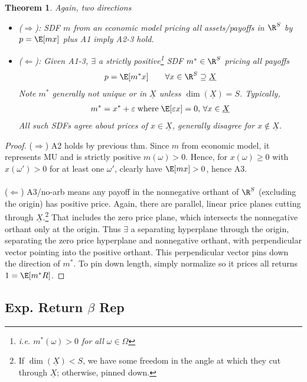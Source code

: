 \documentclass[12pt]{article}
\theoremstyle{plain}
\newtheorem{thm}{Theorem}[section]
\theoremstyle{definition}
\theoremstyle{remark}
\begin{document}
\begin{multicols*}{2}
\begin{thm}
Again, two directions
\begin{itemize}
  \item \emph{($\Rightarrow$):}
    SDF $m$ from an economic model pricing all assets/payoffs
    in $\R^S$ by $p=\E[mx]$ plus A1 imply A2-3 hold.
  \item
    \emph{($\Leftarrow$):}
    Given A1-3, $\exists$ a
    \emph{strictly positive}\footnote{
      i.e. $m^*(\omega)>0$ for all $\omega\in\Omega$
    }
    SDF $m^*\in\R^S$ pricing all payoffs
    \begin{align*}
      p=\E[m^*x]
      \qquad
      \forall
      x\in \R^S\supseteq \underline{X}
    \end{align*}
    Note $m^*$ generally not unique or in $\underline{X}$ unless
    $\dim(\underline{X})=S$.
    Typically,
    \begin{align*}
      m^*=x^*+\varepsilon
      \;\text{where}\;
      \E[\varepsilon x]=0,\,
      \forall x\in\underline{X}
    \end{align*}
    All such SDFs agree about prices of
    $x\in\underline{X}$, generally disagree for
    $x\not\in\underline{X}$.
\end{itemize}
\end{thm}
\begin{proof}
($\Rightarrow$)
A2 holds by previous thm.
Since $m$ from economic model, it represents MU and is strictly
positive $m(\omega)>0$. Hence, for $x(\omega)\geq 0$ with $x(\omega')>0$
for at least one $\omega'$, clearly have $\E[mx]>0$, hence A3.
\\
\\
($\Leftarrow$)
A3/no-arb means any payoff in the nonnegative orthant of
$\R^S$ (excluding the origin) has positive price.
Again, there are parallel, linear price planes cutting through
$\underline{X}$.\footnote{%
  If $\dim(\underline{X})<S$, we have some freedom in the angle at which
  they cut through $\underline{X}$; otherwise, pinned down.
}
That includes the zero price plane, which intersects the nonnegative
orthant only at the origin. Thus $\exists$ a separating hyperplane
through the origin, separating the zero price hyperplane and
nonnegative orthant, with perpendicular vector pointing into the
positive orthant. This perpendicular vector pins down the direction of
$m^*$. To pin down length, simply normalize so it prices all returns
$1=\E[m^*R]$.
\end{proof}


\clearpage
\subsection{Exp. Return $\beta$ Rep}


\end{multicols*}
\end{document}
